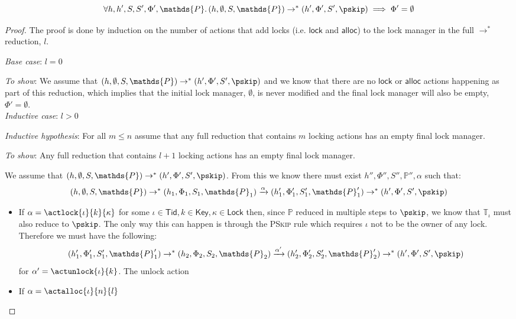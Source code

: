 \begin{lem}
	\label{ref:phiemp}
	\[
		\forall h, h', S, S', \Phi', \mathds{P} \ldotp
		(h, \emptyset, S, \mathds{P})	
			\rightarrow^*
		(h', \Phi', S', \pskip)
			\implies
		\Phi' = \emptyset
	\]
	{\parindent0pt
	\begin{proof}
		The proof is done by induction on the number of actions that add locks  (i.e. $\mathsf{lock}$ and $\mathsf{alloc}$) to the lock manager in the full $\rightarrow^*$ reduction, $l$.
		
		\textit{Base case}: $l  = 0$
		
		\textit{To show}:
		We assume that $(h, \emptyset, S,  \mathds{P}) \rightarrow^* (h', \Phi', S', \pskip)$ and we know that there are no $\mathsf{lock}$ or $\mathsf{alloc}$ actions happening as part of this reduction, which implies that the initial lock manager, $\emptyset$, is never modified and the final lock manager will also be empty, $\Phi' = \emptyset$. \\
		
		\textit{Inductive case}: $l > 0$
		
		\textit{Inductive hypothesis}: For all $m \leq n$ assume that any full reduction that contains $m$ locking actions has an empty final lock manager.
		
		\textit{To show}: Any full reduction that contains $l + 1$ locking actions has an empty final lock manager.
		
		We assume that $(h, \emptyset, S,  \mathds{P}) \rightarrow^* (h', \Phi', S', \pskip)$. From this we know there must exist $h'', \Phi'', S'', \mathds{P}'', \alpha$ such that:
		\[
			(h, \emptyset, S,  \mathds{P})
				\rightarrow^*
			(h_1, \Phi_1, S_1, \mathds{P}_1)
				\xrightarrow{\alpha}
			(h_1', \Phi_1', S_1', \mathds{P}_1')
				\rightarrow^*
			(h', \Phi', S', \pskip)
		\]
		\begin{itemize}
			\item If $\alpha = \actlock{\iota}{k}{\kappa}$ for some $\iota \in \mathsf{Tid}, k \in \mathsf{Key}, \kappa \in \mathsf{Lock}$ then, since $\mathds{P}$ reduced in multiple steps to $\pskip$, we know that $\mathds{T}_\iota$ must also reduce to $\pskip$. The only way this can happen is through the \textsc{PSkip} rule which requires $\iota$ not to be the owner of any lock. Therefore we must have the following:
			\[
				(h_1', \Phi_1', S_1', \mathds{P}_1')
					\rightarrow^*
				(h_2, \Phi_2, S_2, \mathds{P}_2)
					\xrightarrow{\alpha'}
				(h_2', \Phi_2', S_2', \mathds{P}_2')
					\rightarrow^*
				(h', \Phi', S', \pskip)
			\]
			for $\alpha' = \actunlock{\iota}{k}$. The unlock action 
			
			\item If $\alpha = \actalloc{\iota}{n}{l}$
		\end{itemize}
	\end{proof}
	}
\end{lem}

